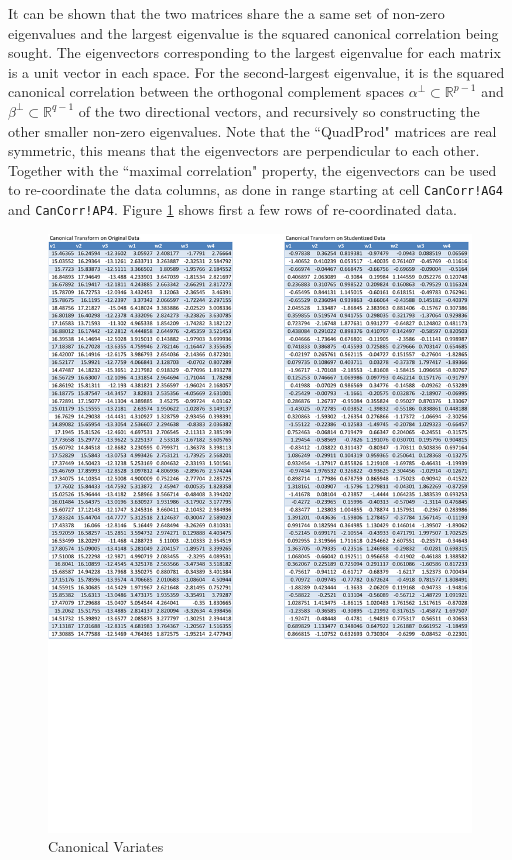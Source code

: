 \documentclass[article]{jss}
\numberwithin{equation}{subsection}
\begin{document}
        It can be shown that the two matrices share the a same set of non-zero eigenvalues and the largest eigenvalue is the squared canonical correlation being sought. The eigenvectors corresponding to the largest eigenvalue for each matrix is a unit vector in each space.
        For the second-largest eigenvalue, it is the squared canonical correlation between the orthogonal complement spaces $\alpha^\bot\subset\mathbb{R}^{p-1}$ and $\beta^\bot\subset\mathbb{R}^{q-1}$ of the two directional vectors, and recursively so constructing the other smaller non-zero eigenvalues. Note that the ``QuadProd" matrices are real symmetric, this means that the eigenvectors are perpendicular to each other. Together with the ``maximal correlation" property, the eigenvectors can be used to re-coordinate the data columns, as done in range starting at cell \texttt{CanCorr!AG4} and \texttt{CanCorr!AP4}. Figure \ref{fig:CanCorrSheetCanCorrVariates} shows first a few rows of re-coordinated data. 
        \begin{figure}[!tbh]
        	\includegraphics[width=\linewidth, keepaspectratio=true]{img/CanCorrSheetCanCorrVariates}
        	\vspace{-20pt}\centering{}\protect\caption{Canonical Variates}\label{fig:CanCorrSheetCanCorrVariates}
        \end{figure}
\end{document}
